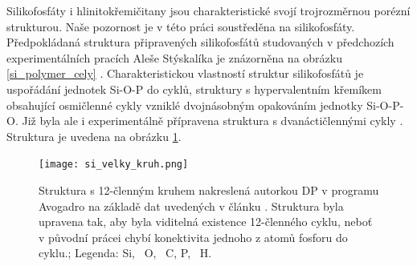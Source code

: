 \documentclass[
digital, %
table,   %
lof,     %
lot,     %
oneside,
]{fithesis3}
\begin{document}
Silikofosfáty i hlinitokřemičitany jsou charakteristické svojí trojrozměrnou  porézní strukturou. Naše pozornost je v této práci soustředěna na silikofosfáty. Předpokládaná struktura připravených silikofosfátů studovaných v předchozích experimentálních pracích Aleše Stýskalíka je znázorněna na obrázku \ref{si_polymer_cely} \cite{Styskalik2015thesis}. Charakteristickou vlastností struktur silikofosfátů je uspořádání jednotek Si-O-P do cyklů, struktury s hypervalentním křemíkem obsahující osmičlenné cykly vzniklé dvojnásobným opakováním jednotky Si-O-P-O. Již byla ale i experimentálně přípravena struktura s dvanáctičlennými cykly \cite{velky_cyklus}. Struktura je uvedena na obrázku \ref{velky_cyklus}.

\begin{figure}
\caption{Struktura s 12-členným kruhem nakreslená autorkou DP v programu Avogadro na základě dat uvedených v článku \cite{velky_cyklus}.  Struktura byla upravena tak, aby byla viditelná existence 12-členného cyklu, neboť v původní prácei chybí konektivita jednoho z atomů fosforu do cyklu.;  Legenda:  Si, ~O, ~C,  P, ~H.}
\center \texttt{[image: si\_velky\_kruh.png]} \label{velky_cyklus} \end{figure}
\end{document}

